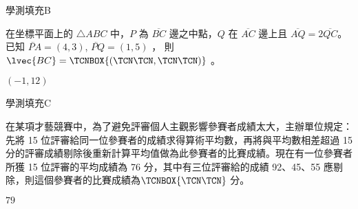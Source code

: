     \begin{QUESTION}
        \begin{ExamInfo}{96}{學測}{填充}{B}
        \end{ExamInfo}
        \begin{ExamAnsRateInfo}{27}{64}{16}{1}
        \end{ExamAnsRateInfo}
        \begin{QBODY}
            在坐標平面上的 $\triangle ABC$ 中，$P$ 為 $\overline{BC}$ 邊之中點，$Q$ 在 $\overline{AC}$ 邊上且 $\overline{AQ} = 2\overline{QC}$。 已知 $\lvec{PA} =(4, 3)$, $\lvec{PQ} = ( 1 , 5 )$ ， 則 $\lvec{BC} = \TCNBOX{(\TCN\TCN,\TCN\TCN)}$ 。
        \end{QBODY}
        \begin{QFROMS}
        \end{QFROMS}
        \begin{QTAGS}\end{QTAGS}
        \begin{QANS}
            $(-1,12)$
        \end{QANS}
        \begin{QSOLLIST}
        \end{QSOLLIST}
        \begin{QEMPTYSPACE}
        \end{QEMPTYSPACE}
    \end{QUESTION}
    \begin{QUESTION}
        \begin{ExamInfo}{96}{學測}{填充}{C}
        \end{ExamInfo}
        \begin{ExamAnsRateInfo}{66}{93}{76}{29}
        \end{ExamAnsRateInfo}
        \begin{QBODY}
            在某項才藝競賽中，為了避免評審個人主觀影響參賽者成績太大，主辦單位規定：先將 15 位評審給同一位參賽者的成績求得算術平均數，再將與平均數相差超過 15 分的評審成績剔除後重新計算平均值做為此參賽者的比賽成績。現在有一位參賽者所獲 15 位評審的平均成績為 76 分，其中有三位評審給的成績 92、45、55 應剔除，則這個參賽者的比賽成績為$\TCNBOX{\TCN\TCN}$ 分。
        \end{QBODY}
        \begin{QFROMS}
        \end{QFROMS}
        \begin{QTAGS}\end{QTAGS}
        \begin{QANS}
            $79$
        \end{QANS}
        \begin{QSOLLIST}
        \end{QSOLLIST}
        \begin{QEMPTYSPACE}
        \end{QEMPTYSPACE}
    \end{QUESTION}
